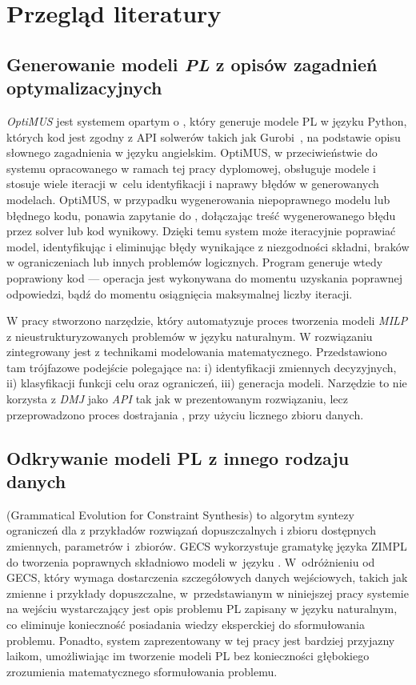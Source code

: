 \chapter{Przegląd literatury}\label{ch:review}

\section{Generowanie modeli \textit{PL} z opisów zagadnień optymalizacyjnych}
\label{sec:optimus}
\textit{OptiMUS} \cite{ahmaditeshnizi2023optimus} jest systemem opartym o , który generuje modele PL w języku Python, których kod jest zgodny z API solwerów takich jak Gurobi~\cite{gurobi2023}, na podstawie opisu słownego zagadnienia w języku angielskim.
OptiMUS, w przeciwieństwie do systemu opracowanego w ramach tej pracy dyplomowej, obsługuje modele  i stosuje wiele iteracji w~celu identyfikacji i naprawy błędów w generowanych modelach.
OptiMUS, w przypadku wygenerowania niepoprawnego modelu lub błędnego kodu, ponawia zapytanie do , dołączając treść wygenerowanego błędu przez solver lub kod wynikowy. Dzięki temu system może iteracyjnie poprawiać model, identyfikując i eliminując błędy wynikające z niezgodności składni, braków w ograniczeniach lub innych problemów logicznych.
Program generuje wtedy poprawiony kod --- operacja jest wykonywana do momentu uzyskania poprawnej odpowiedzi, bądź do momentu osiągnięcia maksymalnej liczby iteracji.

W pracy \cite{li2023synthesizingmixedintegerlinearprogramming} stworzono narzędzie, który automatyzuje proces tworzenia modeli \textit{MILP} z nieustrukturyzowanych problemów w języku naturalnym. W rozwiązaniu zintegrowany jest  z technikami modelowania matematycznego. Przedstawiono tam trójfazowe podejście polegające na: i) identyfikacji zmiennych decyzyjnych, ii) klasyfikacji funkcji celu oraz ograniczeń, iii) generacja modeli. Narzędzie to  nie korzysta z \textit{DMJ} jako \textit{API} tak jak w prezentowanym rozwiązaniu, lecz przeprowadzono proces dostrajania , przy użyciu licznego zbioru danych.

\section{Odkrywanie modeli PL z innego rodzaju danych}
 (Grammatical Evolution for Constraint Synthesis)  \cite{pawlak2021grammatical} to algorytm syntezy ograniczeń dla  z przykładów rozwiązań dopuszczalnych i zbioru dostępnych zmiennych, parametrów i~zbiorów. GECS wykorzystuje gramatykę języka ZIMPL do tworzenia poprawnych składniowo modeli  w~języku . W~odróżnieniu od GECS, który wymaga dostarczenia szczegółowych danych wejściowych, takich jak zmienne i przykłady dopuszczalne, w~przedstawianym w niniejszej pracy systemie na wejściu wystarczający jest opis problemu PL zapisany w języku naturalnym, co eliminuje konieczność posiadania wiedzy eksperckiej do sformułowania problemu. Ponadto, system zaprezentowany w tej pracy jest bardziej przyjazny laikom, umożliwiając im tworzenie modeli PL bez konieczności głębokiego zrozumienia matematycznego sformułowania problemu. 

